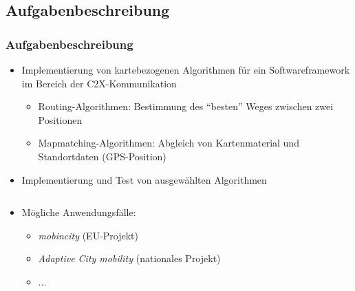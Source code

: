 \subsection{Aufgabenbeschreibung}
\begin{frame}[t] \frametitle{Aufgabenbeschreibung}
  \begin{itemize}
  \item Implementierung von kartebezogenen Algorithmen f\"ur ein Softwareframework im Bereich der C2X-Kommunikation
    \begin{itemize}
    \item {Routing-Algorithmen:} Bestimmung des ``besten'' Weges zwischen zwei Positionen
    \item {Mapmatching-Algorithmen:} Abgleich von Kartenmaterial und Standortdaten (GPS-Position)
    \end{itemize}
  \item Implementierung und Test von ausgew\"ahlten Algorithmen
  \end{itemize}
  \begin{columns}
    \begin{column}{0.35\textwidth}
      \begin{itemize}
      \item M\"ogliche Anwendungsf\"alle: 
        \begin{itemize}
        \item \emph{mobincity} (EU-Projekt)
        \item \emph{Adaptive City mobility} (nationales Projekt)
        \item ...
        \end{itemize}
      \end{itemize}
    \end{column}
    \begin{column}{0.6\textwidth}

\end{column}
\end{columns}
\end{frame}
